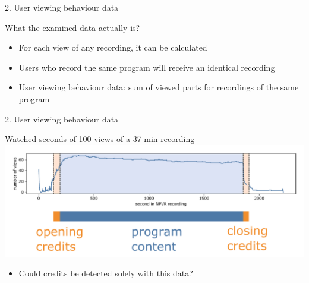 \documentclass[first=orange,second=blue,logo=blueque]{aaltoslides}
\begin{document}

\begin{frame}{2. User viewing behaviour data}
    \begin{block}{{\color{black}\alert{What} the examined data actually is?}}
        \begin{itemize}
            \item For each view of any recording, it can be calculated
                \\ {\color{orange}{which parts of the recording were watched during a view, and which parts were fast forwarded}}
            \item Users who record the same program will receive an identical recording
            \item \alert{User viewing behaviour data}:
            sum of viewed parts for recordings of the same program
        \end{itemize}
    \end{block}
\end{frame}


\begin{frame}{2. User viewing behaviour data}
    \begin{block}{{\color{black}Watched seconds of 100 views of a 37 min recording}}
        \center
        \includegraphics[width=1\textwidth]{figures/data1.pdf}
        \begin{itemize}
            \item Could credits be detected solely with this data?
        \end{itemize}
    \end{block}
\end{frame}

\end{document}
